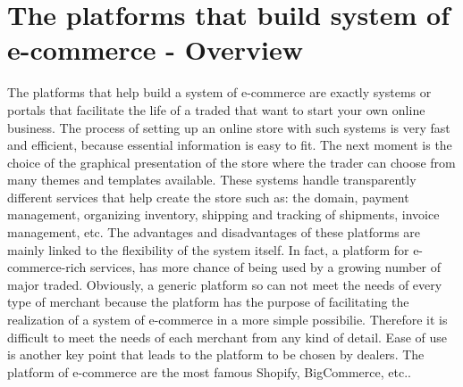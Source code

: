 \section{The platforms that build system of e-commerce - Overview}
\label{sec:platform_overview}
The platforms that help build a system of e-commerce are exactly systems or portals that facilitate the life of a traded that want to start your own online business.
\newline
The process of setting up an online store with such systems is very fast and efficient, because essential information is easy to fit. The next moment is the choice of the graphical presentation of the store where the trader can choose from many themes and templates available.
These systems handle transparently different services that help create the store such as: the domain, payment management, organizing inventory, shipping and tracking of shipments, invoice management, etc.
\newline
The advantages and disadvantages of these platforms are mainly linked to the flexibility of the system itself. In fact, a platform for e-commerce-rich services, has more chance of being used by a growing number of major traded.
\newline
Obviously, a generic platform so can not meet the needs of every type of merchant because the platform has the purpose of facilitating the realization of a system of e-commerce in a more simple possibilie. Therefore it is difficult to meet the needs of each merchant from any kind of detail. Ease of use is another key point that leads to the platform to be chosen by dealers.
\newline
The platform of e-commerce are the most famous Shopify, BigCommerce, etc..
